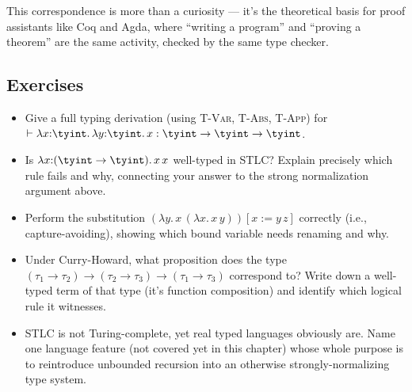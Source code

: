 This correspondence is more than a curiosity — it's the theoretical basis for proof assistants like Coq and Agda, where ``writing a program'' and ``proving a theorem'' are the same activity, checked by the same type checker.

\subsection{Exercises}
\begin{itemize}
  \item Give a full typing derivation (using \textsc{T-Var}, \textsc{T-Abs}, \textsc{T-App}) for $\vdash \lambda x{:}\tyint.\,\lambda y{:}\tyint.\, x : \tyint \to \tyint \to \tyint$.
  \item Is $\lambda x{:}(\tyint\to\tyint).\, x\, x$ well-typed in STLC? Explain precisely which rule fails and why, connecting your answer to the strong normalization argument above.
  \item Perform the substitution $(\lambda y.\, x\,(\lambda x.\, x\,y))[x := y\,z]$ correctly (i.e., capture-avoiding), showing which bound variable needs renaming and why.
  \item Under Curry-Howard, what proposition does the type $(\tau_1 \to \tau_2) \to (\tau_2 \to \tau_3) \to (\tau_1 \to \tau_3)$ correspond to? Write down a well-typed term of that type (it's function composition) and identify which logical rule it witnesses.
  \item STLC is not Turing-complete, yet real typed languages obviously are. Name one language feature (not covered yet in this chapter) whose whole purpose is to reintroduce unbounded recursion into an otherwise strongly-normalizing type system.
\end{itemize}
